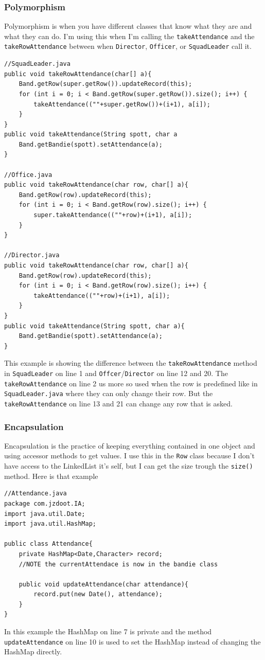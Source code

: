 \documentclass{article}
\begin{document}
\subsubsection{Polymorphism}
Polymorphism is when you have different classes that know what they are and what they can do. I'm using this when I'm calling the \verb|takeAttendance| and the \verb|takeRowAttendance| between when \verb|Director|, \verb|Officer|, or \verb|SquadLeader| call it.
\begin{lstlisting}
//SquadLeader.java
public void takeRowAttendance(char[] a){
	Band.getRow(super.getRow()).updateRecord(this);
	for (int i = 0; i < Band.getRow(super.getRow()).size(); i++) {
		takeAttendance((""+super.getRow())+(i+1), a[i]);
	}
}
public void takeAttendance(String spott, char a
	Band.getBandie(spott).setAttendance(a);
}

//Office.java
public void takeRowAttendance(char row, char[] a){
	Band.getRow(row).updateRecord(this);
	for (int i = 0; i < Band.getRow(row).size(); i++) {
		super.takeAttendance((""+row)+(i+1), a[i]);
	}
}

//Director.java
public void takeRowAttendance(char row, char[] a){
	Band.getRow(row).updateRecord(this);
	for (int i = 0; i < Band.getRow(row).size(); i++) {
		takeAttendance((""+row)+(i+1), a[i]);
	}
}
public void takeAttendance(String spott, char a){
	Band.getBandie(spott).setAttendance(a);
}
\end{lstlisting}
This example is showing the difference between the \verb|takeRowAttendance| method in \verb|SquadLeader| on line 1 and \verb|Offcer|/\verb|Director| on line 12 and 20. The \verb|takeRowAttendance| on line 2 us more so used when the row is predefined like in \verb|SquadLeader.java| where they can only change their row. But the \verb|takeRowAttendance| on line 13 and 21 can change any row that is asked.
\subsubsection{Encapsulation}
Encapsulation is the practice of keeping everything contained in one object and using accessor methods to get values. I use this in the \verb|Row| class because I don't have access to the LinkedList it's self, but I can get the size trough the \verb|size()| method. Here is that example
\begin{lstlisting}
//Attendance.java
package com.jzdoot.IA;
import java.util.Date;
import java.util.HashMap;

public class Attendance{
	private HashMap<Date,Character> record;
	//NOTE the currentAttendace is now in the bandie class

	public void updateAttendance(char attendance){
		record.put(new Date(), attendance);
	}
}
\end{lstlisting}
In this example the HashMap on line 7 is private and the method \verb|updateAttendance| on line 10 is used to set the HashMap instead of changing the HashMap directly.
\end{document}
